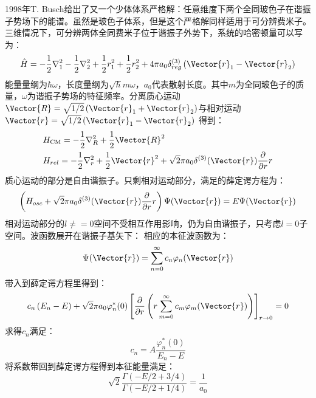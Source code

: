 1998年T. Busch给出了又一个少体体系严格解：任意维度下两个全同玻色子在谐振子势场下的能谱。虽然是玻色子体系，但是这个严格解同样适用于可分辨费米子。三维情况下，可分辨两体全同费米子位于谐振子外势下，系统的哈密顿量可以写为：
\begin{equation}
\hat{H}=-\frac{1}{2} \nabla_{1}^{2}-\frac{1}{2} \nabla_{2}^{2}+\frac{1}{2} r_{1}^{2}+\frac{1}{2} r_{2}^{2}+4 \pi a_{0} \delta_{r e g}^{(3)}\left(\Vector{r}_{1}-\Vector{r}_{2}\right)
\end{equation}
能量量纲为$\hbar\omega$，长度量纲为$\sqrt{\hbar}{m\omega}$，$a_0$代表散射长度。其中$m$为全同玻色子的质量，$\omega$为谐振子势场的特征频率。分离质心运动$\Vector{R}=\sqrt{1 / 2}\left(\Vector{r}_{1}+\Vector{r}_{2}\right)$与相对运动$\Vector{r}=\sqrt{1 / 2}\left(\Vector{r}_{1}-\Vector{r}_{2}\right)$
得到：
\begin{equation}
\begin{aligned}
&H_{\mathrm{CM}}=-\frac{1}{2} \nabla_{R}^{2}+\frac{1}{2} \Vector{R}^{2}\\
&H_{r e l}=-\frac{1}{2} \nabla_{r}^{2}+\frac{1}{2} \Vector{r}^{2}+\sqrt{2} \pi a_{0} \delta^{(3)}(\Vector{r}) \frac{\partial}{\partial r} r\\
\end{aligned}
\end{equation}
质心运动的部分是自由谐振子。只剩相对运动部分，满足的薛定谔方程为：
\begin{equation}
\left(H_{o s c}+\sqrt{2} \pi a_{0} \delta^{(3)}(\Vector{r}) \frac{\partial}{\partial r} r\right) \Psi(\Vector{r})=E \Psi(\Vector{r})
\end{equation}
相对运动部分的$l\neq=0$空间不受相互作用影响，仍为自由谐振子，只考虑$l=0$子空间。波函数展开在谐振子基矢下：
相应的本征波函数为：
\begin{equation}
\Psi(\Vector{r})=\sum_{n=0}^{\infty} c_{n} \varphi_{n}(\Vector{r})
\end{equation}
带入到薛定谔方程里得到：
\begin{equation}
c_{n}\left(E_{n}-E\right)+\sqrt{2} \pi a_{0} \varphi_{n}^{*}(0)\left[\frac{\partial}{\partial r}\left(r \sum_{m=0}^{\infty} c_{m} \varphi_{m}(\Vector{r})\right)\right]_{r \rightarrow 0}=0
\end{equation}
求得$c_n$满足：
\begin{equation}
c_{n}=A \frac{\varphi_{n}^{*}(0)}{E_{n}-E}
\end{equation}
将系数带回到薛定谔方程得到本征能量满足：
\begin{equation}
\sqrt{2} \frac{\Gamma(-E / 2+3 / 4)}{\Gamma(-E / 2+1 / 4)}=\frac{1}{a_{0}}
\end{equation}
